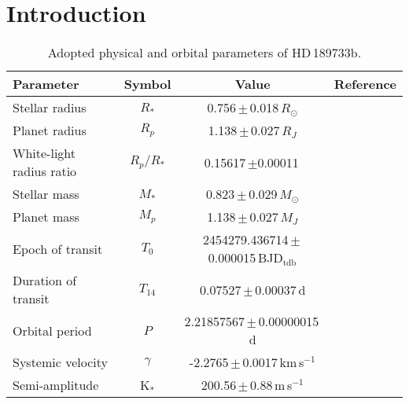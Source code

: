 \documentclass{aa}
\begin{document}
   \maketitle
%

\section{Introduction}
\begin{table*}[h]
\centering
\caption{\footnotesize Adopted physical and orbital parameters of HD\,189733b.}\label{paramètres utilisées}
\begin{tabular}{lccr}
\hline
Parameter & Symbol & Value & Reference \\
\hline
Stellar radius & $R_{*}$ & 0.756\,$\pm$\,0.018\,$R_{\odot}$ & \cite{torres_improved_2008} \\

Planet radius & $R_{p}$ & 1.138\,$\pm$\,0.027\,$R_{J}$ & \cite{torres_improved_2008} \\

White-light radius ratio & $R_{p}/R_{*}$ & 0.15617\,$\pm$0.00011\, & \cite{sing_hubble_2011} \\

Stellar mass & $M_{*}$ & 0.823\,$\pm$\,0.029\,$M_{\odot}$ & \cite{triaud_rossiter-mclaughlin_2009} \\

Planet mass & $M_{p}$ & 1.138\,$\pm$\,0.027\,$M_{J}$ & \cite{triaud_rossiter-mclaughlin_2009} \\

Epoch of transit & $T_{0}$ & 2454279.436714\,$\pm$\,0.000015\,BJD$_\mathrm{tdb}$ & \cite{agol_climate_2010}\\

Duration of transit & $T_{14}$ & 0.07527\,$\pm$\,0.00037\,d  & \cite{triaud_rossiter-mclaughlin_2009} \\

Orbital period & $P$ & 2.21857567\,$\pm$\,0.00000015\,d & \cite{torres_improved_2008}\\

Systemic velocity & $\gamma$ & -2.2765\,$\pm$\,0.0017\,km\,s$^{-1}$ & \cite{boisse_stellar_2009} \\

Semi-amplitude & K$_*$ & 200.56\,$\pm$\,0.88\,m\,s$^{-1}$ & \cite{boisse_stellar_2009}\\
\hline
\end{tabular}
\end{table*}
\end{document}
